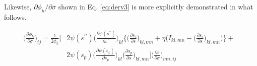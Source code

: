 \documentclass[12pt]{amsart}
\begin{document}
Likewise, $\partial\phi_h/\partial\sigma$ shown in Eq. \ref{eq:derv3} is more explicitly demonstrated in what follows.


\begin{equation}
  \label{eq:dphih_dsig}
  \begin{split}
    \Big(\frac{\partial\phi_h}{\partial\sigma}\Big)_{ij} = \frac{1}{2\phi_h}\Bigg[& 2\psi(s^{\prime\prime})\Big(\frac{\partial\psi(s^{\prime\prime})}{\partial s^{\prime\prime}}\Big)_{kl}
    \bigg\{
    \bigg( \frac{\partial s_c}{\partial s}\bigg)_{kl,mn} + \eta \bigg(I_{kl,mn} -   \bigg(\frac{\partial s_c}{\partial s}\bigg)_{kl,mn} \bigg)
    \bigg\} + \\
    & 2\psi(s_p) \Big(\frac{\partial \psi(s_p) }{\partial s_p}\Big)_{kl}
    \Big(
    \frac{\partial s_p}{\partial s}
    \Big)_{kl,mn}
    \Bigg]
    \Big(\frac{\partial s}{\partial \sigma}\Big)_{mn,ij}
  \end{split}
\end{equation}

\newpage
\end{document}
